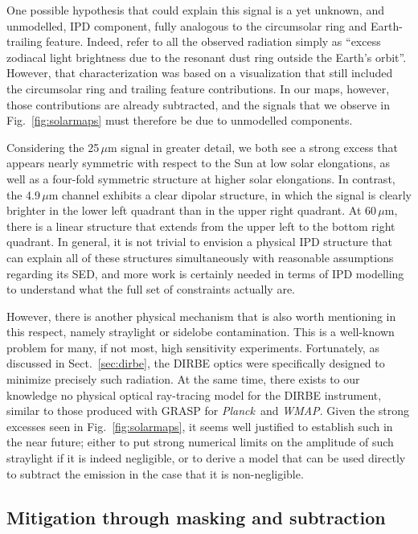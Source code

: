 \documentclass{aa}
\def\Planck{\textit{Planck}}
\def\WMAP{\textit{WMAP}}
\begin{document}
One possible hypothesis that could explain this signal is a yet
unknown, and unmodelled, IPD component, fully analogous to the
circumsolar ring and Earth-trailing feature. Indeed,
\citet{leinert:1998} refer to all the observed radiation simply as
``excess zodiacal light brightness due to the resonant dust ring
outside the Earth’s orbit''. However, that characterization was based
on a visualization that still included the circumsolar ring and
trailing feature contributions. In our maps, however, those
contributions are already subtracted, and the signals that we observe
in Fig.~\ref{fig:solarmaps} must therefore be due to unmodelled
components.

Considering the 25$\,\mu$m signal in greater detail, we both see a strong
excess that appears nearly symmetric with respect to the Sun at low
solar elongations, as well as a four-fold symmetric structure at
higher solar elongations. In contrast, the 4.9$\,\mu$m channel
exhibits a clear dipolar structure, in which the signal is clearly
brighter in the lower left quadrant than in the upper right
quadrant. At 60$\,\mu$m, there is a linear structure that extends from
the upper left to the bottom right quadrant. In general, it is not
trivial to envision a physical IPD structure that can explain all of
these structures simultaneously with reasonable assumptions regarding
its SED, and more work is certainly needed in terms of IPD modelling
to understand what the full set of constraints actually are.

However, there is another physical mechanism that is also worth
mentioning in this respect, namely straylight or sidelobe
contamination. This is a well-known problem for many, if not most,
high sensitivity experiments. Fortunately, as discussed in
Sect.~\ref{sec:dirbe}, the DIRBE optics were specifically designed to
minimize precisely such radiation. At the same time, there exists to
our knowledge no physical optical ray-tracing model for the DIRBE
instrument, similar to those produced with GRASP \citep{grasp} for \Planck\ and
\WMAP. Given the strong excesses seen in Fig.~\ref{fig:solarmaps}, it
seems well justified to establish such in the near future; either to
put strong numerical limits on the amplitude of such straylight if it
is indeed negligible, or to derive a model that can be used directly
to subtract the emission in the case that it is non-negligible.



\subsection{Mitigation through masking and subtraction}
\end{document}

